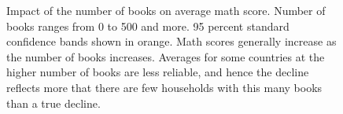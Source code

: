 \documentclass[
  11pt,
  a4paper,
]{article}
\begin{document}
\begin{figure}[H]


\caption{\label{fig-bookplot}Impact of the number of books on average
math score. Number of books ranges from 0 to 500 and more. 95 percent
standard confidence bands shown in orange. Math scores generally
increase as the number of books increases. Averages for some countries
at the higher number of books are less reliable, and hence the decline
reflects more that there are few households with this many books than a
true decline.}

\end{figure}%
\end{document}
